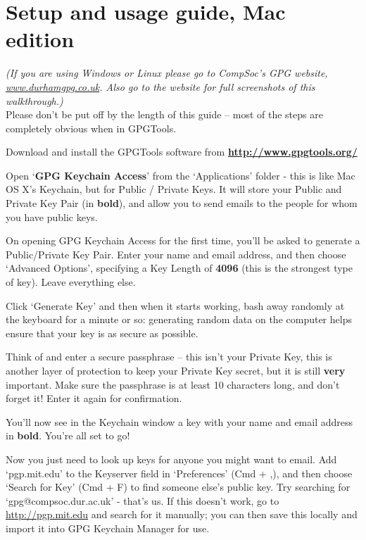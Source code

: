 \section{Setup and usage guide, Mac edition}
\textit{(If you are using Windows or Linux please go to CompSoc's GPG website, \href{http://www.durhamgpg.co.uk}{www.durhamgpg.co.uk}. Also go to the website for full screenshots of this walkthrough.)} \\
Please don't be put off by the length of this guide -- most of the steps are completely obvious when in GPGTools.
\begin{compactenum}[1.]%
  \item Download and install the GPGTools software from \textbf{\href{http://www.gpgtools.org/}{http://www.gpgtools.org/}}
  \item Open `\textbf{GPG Keychain Access}' from the `Applications' folder - this is like Mac OS X's Keychain, but for Public / Private Keys. It will store your Public and Private Key Pair (in \textbf{bold}), and allow you to send emails to the people for whom you have public keys.
  \item On opening GPG Keychain Access for the first time, you'll be asked to generate a Public/Private Key Pair. Enter your name and email address, and then choose `Advanced Options', specifying a Key Length of \textbf{4096} (this is the strongest type of key). Leave everything else.
  \item Click `Generate Key' and then when it starts working, bash away randomly at the keyboard for a minute or so: generating random data on the computer helps ensure that your key is as secure as possible.
  \item Think of and enter a secure passphrase -- this isn't your Private Key, this is another layer of protection to keep your Private Key secret, but it is still \textbf{very} important. Make sure the passphrase is at least 10 characters long, and don't forget it! Enter it again for confirmation.
  \item You'll now see in the Keychain window a key with your name and email address in \textbf{bold}. You're all set to go! 
  \item Now you just need to look up keys for anyone you might want to email. Add `pgp.mit.edu' to the Keyserver field in `Preferences' (Cmd + ,), and then choose `Search for Key' (Cmd + F) to find someone else's public key. Try searching for `gpg@compsoc.dur.ac.uk' - that's us. If this doesn't work, go to \href{http://pgp.mit.edu}{http://pgp.mit.edu} and search for it manually; you can then save this locally and import it into GPG Keychain Manager for use.

\end{compactenum}

